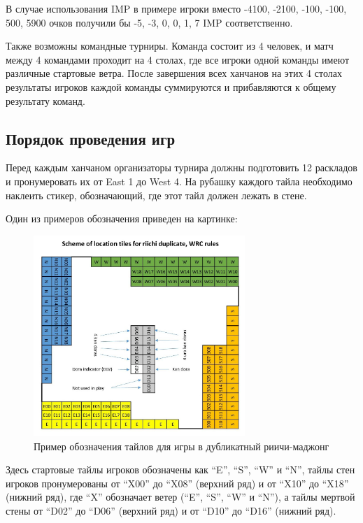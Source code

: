 \begin{additional}
\vspace{0.3cm}

В случае использования IMP в примере игроки вместо -4100, -2100, -100, -100, 500, 5900 очков получили бы -5, -3, 0, 0, 1, 7 IMP соответственно.

\vspace{0.3cm}

Также возможны командные турниры. Команда состоит из 4 человек, и матч между 4 командами проходит на 4 столах, где все игроки одной команды имеют различные стартовые ветра. После завершения всех ханчанов на этих 4 столах результаты игроков каждой команды суммируются и прибавляются к общему результату команд.

\subsection{Порядок проведения игр}

Перед каждым ханчаном организаторы турнира должны подготовить 12 раскладов и пронумеровать их от East 1 до West 4. На рубашку каждого тайла необходимо наклеить стикер, обозначающий, где этот тайл должен лежать в стене.

Один из примеров обозначения приведен на картинке:

\begin{figure}[H]
	\centering
	\includegraphics[width=8cm]{img/duplicate_marks.jpg}
	\caption{Пример обозначения тайлов для игры в дубликатный риичи-маджонг}
\end{figure}

Здесь стартовые тайлы игроков обозначены как ``E'', ``S'', ``W'' и ``N'', тайлы стен игроков пронумерованы от ``X00'' до ``X08'' (верхний ряд) и от ``X10'' до ``X18'' (нижний ряд), где ``X'' обозначает ветер (``E'', ``S'', ``W'' и ``N''), а тайлы мертвой стены от ``D02'' до ``D06'' (верхний ряд) и от ``D10'' до ``D16'' (нижний ряд).


\end{additional}
